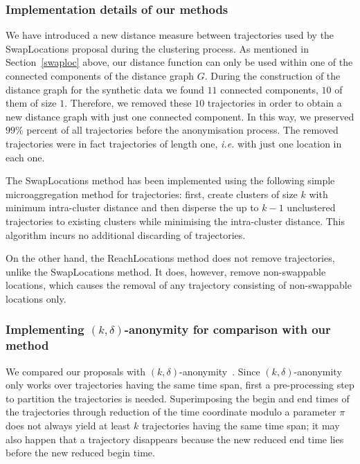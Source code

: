 \subsubsection{Implementation details of our methods}

We have introduced a new distance measure between trajectories used by
the SwapLocations proposal during the clustering process.
As mentioned in Section~\ref{swaploc} above,
our distance function can only be used
within one of the connected components of the distance graph $G$.
During the construction of
the distance graph for the synthetic data we found $11$ connected
components, $10$ of them of size $1$. Therefore, we removed these $10$
trajectories in order to obtain a new distance graph with just one connected
component. In this way, we preserved $99\%$ percent of all
trajectories before the anonymisation process. The
removed trajectories were in fact trajectories of length one, {\em i.e.}
with just one location in each one.

The SwapLocations method has been implemented using the
following simple microaggregation method for trajectories:
first, create clusters of  size $k$ with minimum
intra-cluster distance and then disperse the up to $k-1$
unclustered trajectories to existing
clusters while minimising the intra-cluster distance. This algorithm incurs
no additional discarding of trajectories.

On the other hand, the ReachLocations method
does not remove trajectories, unlike the SwapLocations method.
It does, however, remove non-swappable locations, which
causes the removal of any trajectory consisting of
non-swappable locations only.

\subsubsection{Implementing $(k, \delta)$-anonymity for comparison with
our method}

We compared our proposals with $(k, \delta)$-anonymity~\cite{abul08}. Since
$(k, \delta)$-anonymity only works over trajectories having the same
time span, first a pre-processing step to partition the trajectories is
needed. Superimposing the begin and end times of the trajectories
through reduction of the time coordinate modulo a parameter
$\pi$ does not always yield
at least $k$ trajectories having the same time span; it may also happen that a
trajectory disappears because the new reduced end time lies before the new
reduced begin time.

